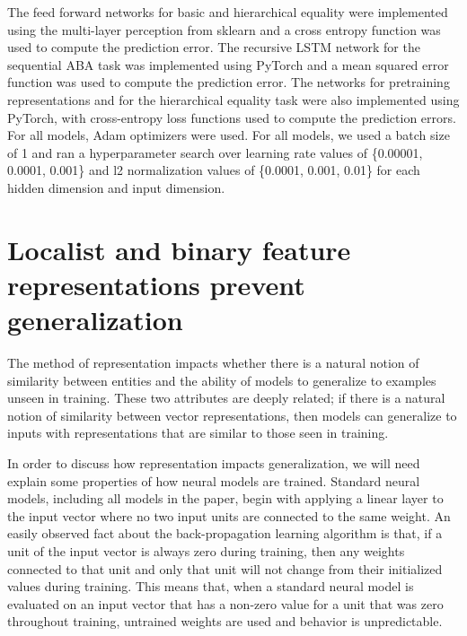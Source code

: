 The feed forward networks for basic and hierarchical equality were implemented using the multi-layer perception from sklearn and a cross entropy function was used to compute the prediction error. The recursive LSTM network for the sequential ABA task was implemented using PyTorch and a mean squared error function was used to compute the prediction error. The networks for pretraining representations and for the hierarchical equality task were also implemented using PyTorch, with cross-entropy loss functions used to compute the prediction errors. For all models, Adam optimizers \citep{Kingma:Ba:2015} were used. For all models, we used a batch size of 1 and ran a hyperparameter search over learning rate values of \{0.00001, 0.0001, 0.001\} and l2 normalization values of \{0.0001, 0.001, 0.01\} for each hidden dimension and input dimension.  


\section{Localist and binary feature representations prevent generalization}\label{app:generalization}

The method of representation impacts whether there is a natural notion of similarity between entities and the ability of models to generalize to examples unseen in training. These two attributes are deeply related; if there is a natural notion of similarity between vector representations, then models can generalize to inputs with representations that are similar to those seen in training.

In order to discuss how representation impacts generalization, we will need explain some properties of how neural models are trained. Standard neural models, including all models in the paper, begin with applying a linear layer to the input vector where no two input units are connected to the same weight. An easily observed fact about the back-propagation learning algorithm is that, if a unit of the input vector is always zero during training, then any weights connected to that unit and only that unit will not change from their initialized values during training. This means that, when a standard neural model is evaluated on an input vector that has a non-zero value for a unit that was zero throughout training, untrained weights are used and behavior is unpredictable.

